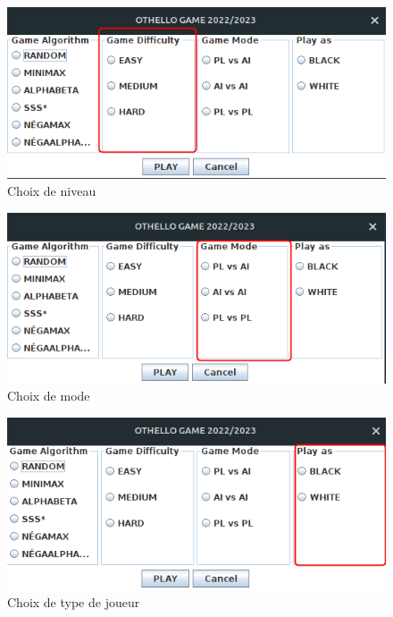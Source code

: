 \documentclass[12pt]{article}
\begin{document}
	\begin{figure}[H]
	\centering
	\includegraphics[scale=0.7]{img/diff.png}
	\caption{Choix de niveau }
	\label{niveau}
\end{figure}

	\begin{figure}[H]
	\centering
	\includegraphics[scale=0.7]{img/mode.png}
	\caption{Choix de mode }
	\label{mode}
\end{figure}

	\begin{figure}[H]
	\centering
	\includegraphics[scale=0.7]{img/joueur.png}
	\caption{Choix de type de joueur }
	\label{joueur}
\end{figure}
	
\end{document}
